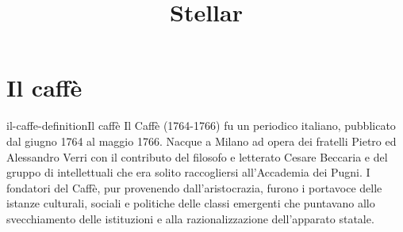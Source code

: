 \documentclass[preview]{standalone}
\begin{document}
\title{Stellar}
\genpage

\section{Il caffè}

\begin{snippetdefinition}{il-caffe-definition}{Il caffè}
    Il Caffè (1764-1766) fu un periodico italiano, pubblicato dal giugno 1764 al maggio 1766.
    Nacque a Milano ad opera dei fratelli Pietro ed Alessandro Verri con il contributo del
    filosofo e letterato Cesare Beccaria e del gruppo di intellettuali che era solito raccogliersi
    all'Accademia dei Pugni. I fondatori del Caffè, pur provenendo dall'aristocrazia,
    furono i portavoce delle istanze culturali, sociali e politiche delle classi emergenti che
    puntavano allo svecchiamento delle istituzioni e alla razionalizzazione dell'apparato statale.
\end{snippetdefinition}

\end{document}
